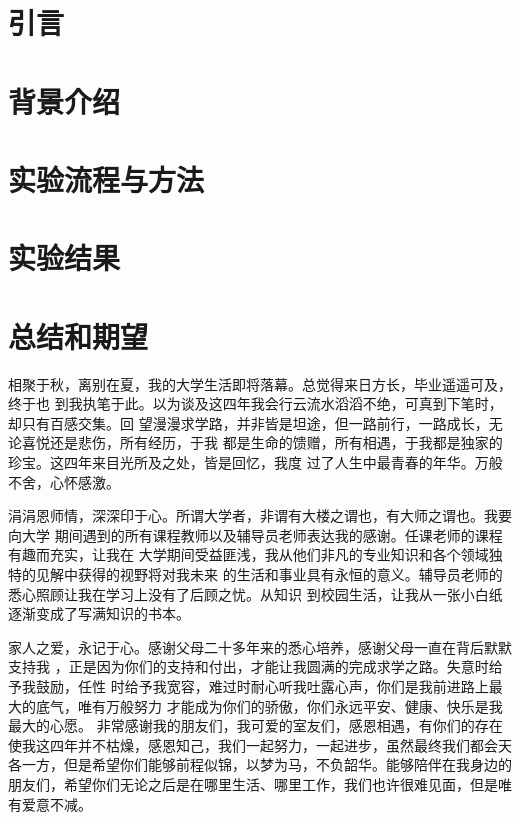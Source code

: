 \documentclass[AutoFakeBold]{LZUThesis}
\begin{document}
\chapter{引言}


\chapter{背景介绍}


\chapter{实验流程与方法}


\chapter{实验结果}


\chapter{总结和期望}


\backmatter


\printbib


\Thanks


相聚于秋，离别在夏，我的大学生活即将落幕。总觉得来日方长，毕业遥遥可及，终于也
到我执笔于此。以为谈及这四年我会行云流水滔滔不绝，可真到下笔时，却只有百感交集。回
望漫漫求学路，并非皆是坦途，但一路前行，一路成长，无论喜悦还是悲伤，所有经历，于我
都是生命的馈赠，所有相遇，于我都是独家的珍宝。这四年来目光所及之处，皆是回忆，我度
过了人生中最青春的年华。万般不舍，心怀感激。 

涓涓恩师情，深深印于心。所谓大学者，非谓有大楼之谓也，有大师之谓也。我要向大学
期间遇到的所有课程教师以及辅导员老师表达我的感谢。任课老师的课程有趣而充实，让我在
大学期间受益匪浅，我从他们非凡的专业知识和各个领域独特的见解中获得的视野将对我未来
的生活和事业具有永恒的意义。辅导员老师的悉心照顾让我在学习上没有了后顾之忧。从知识
到校园生活，让我从一张小白纸逐渐变成了写满知识的书本。 

家人之爱，永记于心。感谢父母二十多年来的悉心培养，感谢父母一直在背后默默支持我
，正是因为你们的支持和付出，才能让我圆满的完成求学之路。失意时给予我鼓励，任性
时给予我宽容，难过时耐心听我吐露心声，你们是我前进路上最大的底气，唯有万般努力
才能成为你们的骄傲，你们永远平安、健康、快乐是我最大的心愿。
非常感谢我的朋友们，我可爱的室友们，感恩相遇，有你们的存在使我这四年并不枯燥，感恩知己，我们一起努力，一起进步，虽然最终我们都会天各一方，但是希望你们能够前程似锦，以梦为马，不负韶华。能够陪伴在我身边的朋友们，希望你们无论之后是在哪里生活、哪里工作，我们也许很难见面，但是唯有爱意不减。
\end{document}
